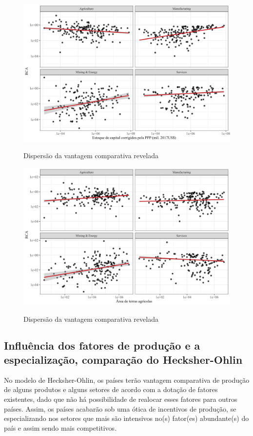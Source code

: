 \begin{figure}[!h]
    \centering
    \caption{Dispersão da vantagem comparativa revelada}
    \includegraphics*[width = 0.8\linewidth]{../plots/rca_k_ppp.png}
    \label{fig:kppp}
\end{figure}

\begin{figure}[!h]
    \centering
    \caption{Dispersão da vantagem comparativa revelada}
    \includegraphics*[width = 0.8\linewidth]{../plots/rca_land.png}
    \label{fig:agro}
\end{figure}

\subsection{Influência dos fatores de produção e a especialização, comparação do Hecksher-Ohlin}

No modelo de Hecksher-Ohlin, os países terão vantagem comparativa de produção de alguns produtos e alguns setores de acordo com a dotação de fatores existentes, dado que não há possibilidade de realocar esses fatores para outros países. Assim, os países acabarão sob uma ótica de incentivos  de produção, se especializando nos setores que mais são intensivos no(s) fator(es) abundante(s) do país e assim sendo mais competitivos.

